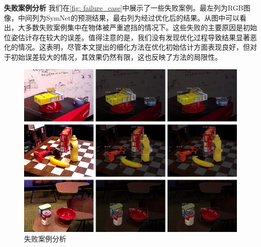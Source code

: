 \textbf{失败案例分析 } 我们在\autoref{fig: failure_case}中展示了一些失败案例。最左列为RGB图像，中间列为SymNet的预测结果，最右列为经过优化后的结果。从图中可以看出，大多数失败案例集中在物体被严重遮挡的情况下。这些失败的主要原因是初始位姿估计存在较大的误差。值得注意的是，我们没有发现优化过程导致结果显著恶化的情况。这表明，尽管本文提出的细化方法在优化初始估计方面表现良好，但对于初始误差较大的情况，其效果仍然有限，这也反映了方法的局限性。

\begin{figure}[htbp]
\centerline{\includegraphics[width=1.0\textwidth]{figure/ca/failure_case.jpg}}
    \caption{失败案例分析}
    \label{fig: failure_case}
\end{figure}
